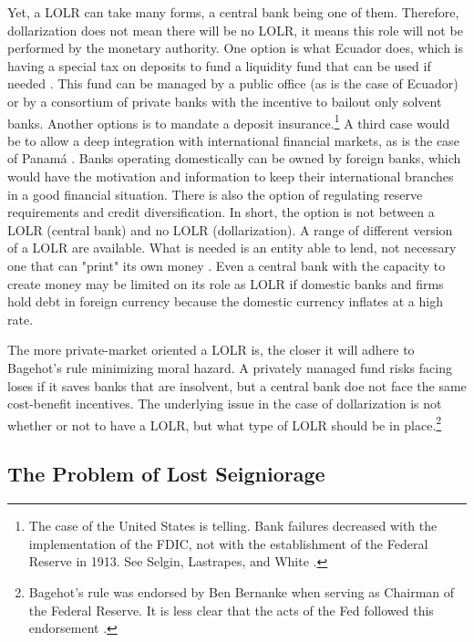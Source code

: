 \documentclass[12pt]{article}
\begin{document}
Yet, a LOLR can take many forms, a central bank being one of them. Therefore, dollarization does not mean there will be no LOLR, it means this role will not be performed by the monetary authority. One option is what Ecuador does, which is having a special tax on deposits to fund a liquidity fund that can be used if needed \parencite{Quispe-Agnoli2006}. This fund can be managed by a public office (as is the case of Ecuador) or by a consortium of private banks with the incentive to bailout only solvent banks. Another options is to mandate a deposit insurance.\footnote{The case of the United States is telling. Bank failures decreased with the implementation of the FDIC, not with the establishment of the Federal Reserve in 1913. See Selgin, Lastrapes, and White \parencite*[][pp. 582-583]{Selgin2012a}.} A third case would be to allow a deep integration with international financial markets, as is the case of Panamá \parencite{MorenoVillalaz1999,MorenoVillalaz2005}. Banks operating domestically can be owned by foreign banks, which would have the motivation and information to keep their international branches in a good financial situation. There is also the option of regulating reserve requirements and credit diversification. In short, the option is not between a LOLR (central bank) and no LOLR (dollarization). A range of different version of a LOLR are available. What is needed is an entity able to lend, not necessary one that can "print" its own money \parencite{Calvo2001}. Even a central bank with the capacity to create money may be limited on its role as LOLR if domestic banks and firms hold debt in foreign currency because the domestic currency inflates at a high rate.

The more private-market oriented a LOLR is, the closer it will adhere to Bagehot's rule minimizing moral hazard. A privately managed fund risks facing loses if it saves banks that are insolvent, but a central bank doe not face the same cost-benefit incentives. The underlying issue in the case of dollarization is not whether or not to have a LOLR, but what type of LOLR should be in place.\footnote{Bagehot's rule was endorsed by Ben Bernanke when serving as Chairman of the Federal Reserve. It is less clear that the acts of the Fed followed this endorsement \parencite{Hogan2015b}.}

\subsection{The Problem of Lost Seigniorage}
\end{document}
